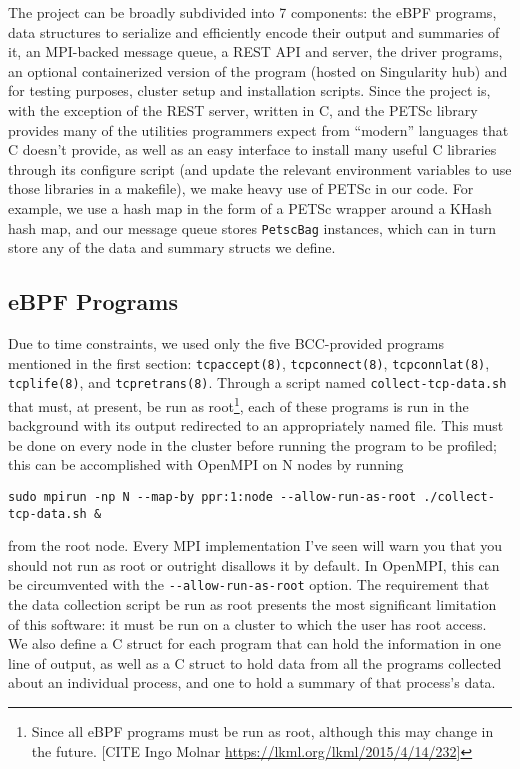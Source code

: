 
The project can be broadly subdivided into 7 components: the eBPF programs, data structures to serialize and efficiently encode their output and summaries of it, an MPI-backed message queue, a REST API and server, the driver programs, an optional containerized version of the program (hosted on Singularity hub) and for testing purposes, cluster setup and installation scripts. Since the project is, with the exception of the REST server, written in C, and the PETSc library provides many of the utilities programmers expect from ``modern'' languages that C doesn't provide, as well as an easy interface to install many useful C libraries through its configure script (and update the relevant environment variables to use those libraries in a makefile), we make heavy use of PETSc in our code. For example, we use a hash map in the form of a PETSc wrapper around a KHash hash map, and our message queue stores \lstinline{PetscBag} instances, which can in turn store any of the data and summary structs we define.
\subsection*{eBPF Programs}
Due to time constraints, we used only the five BCC-provided programs mentioned in the first section: \lstinline{tcpaccept(8)}, \lstinline{tcpconnect(8)}, \lstinline{tcpconnlat(8)}, \lstinline{tcplife(8)}, and \lstinline{tcpretrans(8)}. Through a script named \lstinline{collect-tcp-data.sh} that must, at present, be run as root\footnote{Since all eBPF programs must be run as root, although this may change in the future. [CITE Ingo Molnar \url{https://lkml.org/lkml/2015/4/14/232}]}, each of these programs is run in the background with its output redirected to an appropriately named file. This must be done on every node in the cluster before running the program to be profiled; this can be accomplished with OpenMPI on N nodes by running
\begin{Verbatim}
sudo mpirun -np N --map-by ppr:1:node --allow-run-as-root ./collect-tcp-data.sh &
\end{Verbatim}
from the root node. Every MPI implementation I've seen will warn you that you should not run as root or outright disallows it by default. In OpenMPI, this can be circumvented with the \lstinline{--allow-run-as-root} option. The requirement that the data collection script be run as root presents the most significant limitation of this software: it must be run on a cluster to which the user has root access. \\
We also define a C struct for each program that can hold the information in one line of output, as well as a C struct to hold data from all the programs collected about an individual process, and one to hold a summary of that process's data.
